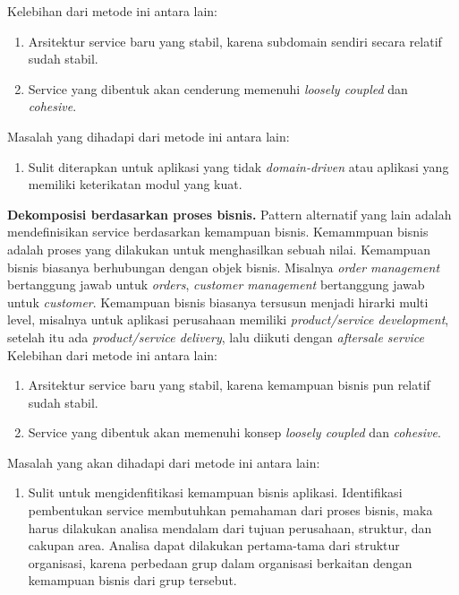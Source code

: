 Kelebihan dari metode ini antara lain:
\begin{enumerate}[leftmargin=*]
	\item Arsitektur service baru yang stabil, karena subdomain sendiri secara relatif sudah stabil.
	\item Service yang dibentuk akan cenderung memenuhi \textit{loosely coupled} dan \textit{cohesive}.
\end{enumerate}
Masalah yang dihadapi dari metode ini antara lain:
\begin{enumerate}[leftmargin=*]
	\item Sulit diterapkan untuk aplikasi yang tidak \textit{domain-driven} atau aplikasi yang memiliki keterikatan modul yang kuat.
\end{enumerate}
\textbf{Dekomposisi berdasarkan proses bisnis.} Pattern alternatif yang lain adalah mendefinisikan service berdasarkan kemampuan bisnis. Kemammpuan bisnis adalah proses yang dilakukan untuk menghasilkan sebuah nilai. Kemampuan bisnis biasanya berhubungan dengan objek bisnis. Misalnya \textit{order management} bertanggung jawab untuk \textit{orders}, \textit{customer management} bertanggung jawab untuk \textit{customer}.  Kemampuan bisnis biasanya tersusun menjadi hirarki multi level, misalnya untuk aplikasi perusahaan memiliki \textit{product/service development}, setelah itu ada \textit{product/service delivery}, lalu diikuti dengan \textit{aftersale service} \cite{6}
Kelebihan dari metode ini antara lain:
\begin{enumerate}[leftmargin=*]
	\item Arsitektur service baru yang stabil, karena kemampuan bisnis pun relatif sudah stabil.
	\item Service yang dibentuk akan memenuhi konsep \textit{loosely coupled} dan \textit{cohesive}.
\end{enumerate}
Masalah yang akan dihadapi dari metode ini antara lain:
\begin{enumerate}[leftmargin=*]
	\item Sulit untuk mengidenfitikasi kemampuan bisnis aplikasi. Identifikasi pembentukan service membutuhkan pemahaman dari proses bisnis, maka harus dilakukan analisa mendalam dari tujuan perusahaan, struktur, dan cakupan area. Analisa dapat dilakukan pertama-tama dari struktur organisasi, karena perbedaan grup dalam organisasi berkaitan dengan kemampuan bisnis dari grup tersebut.
\end{enumerate}
